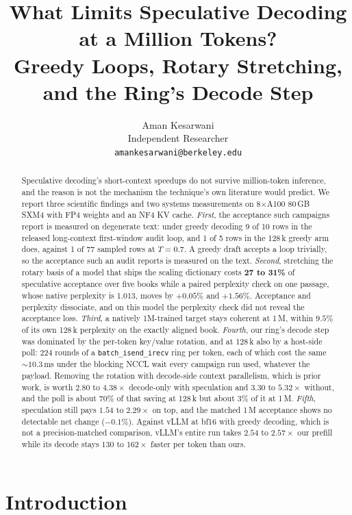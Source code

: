 \documentclass{article}
\author{%
  Aman Kesarwani \\
  Independent Researcher \\
  \texttt{amankesarwani@berkeley.edu} \\
}
\title{What Limits Speculative Decoding at a Million Tokens?\\
       Greedy Loops, Rotary Stretching, and the Ring's Decode Step}
\begin{document}
\maketitle

\begin{abstract}
Speculative decoding's short-context speedups do not survive million-token inference, and the
reason is not the mechanism the technique's own literature would predict. We report three
scientific findings and two systems measurements on 8$\times$A100 80\,GB SXM4 with FP4 weights
and an NF4 KV cache. \emph{First}, the acceptance such campaigns report is measured on
degenerate text: under greedy decoding 9 of 10 rows in the released long-context first-window
audit loop, and 1 of 5 rows in the 128\,k greedy arm does, against 1 of 77 sampled rows at
$T{=}0.7$. A greedy draft accepts a loop trivially, so the acceptance such an audit reports is
measured on the text. \emph{Second}, stretching the rotary basis of a model that ships the scaling dictionary
costs \textbf{27 to 31\%} of speculative acceptance over five books while a paired perplexity
check on one passage, whose native perplexity is 1.013, moves by $+0.05\%$ and $+1.56\%$.
Acceptance and perplexity dissociate, and on this model the perplexity check did not reveal
the acceptance loss. \emph{Third}, a natively 1M-trained target stays coherent at 1\,M, within
$9.5\%$ of its own 128\,k perplexity on the exactly aligned book. \emph{Fourth}, our ring's
decode step was dominated by the per-token key/value rotation, and at 128\,k also by a
host-side poll: 224 rounds of a \texttt{batch\_isend\_irecv} ring per token, each of which
cost the same ${\sim}10.3$\,ms under the blocking NCCL wait every campaign run used, whatever
the payload. Removing the rotation with decode-side context parallelism, which is prior work,
is worth $2.80$ to $4.38\times$ decode-only with speculation and $3.30$ to $5.32\times$
without, and the poll is about 70\% of that saving at 128\,k but about 3\% of it at 1\,M. \emph{Fifth}, speculation still pays $1.54$ to $2.29\times$ on top, and the matched
1\,M acceptance shows no detectable net change ($-0.1\%$). Against vLLM at bf16 with greedy
decoding, which is not a precision-matched comparison, vLLM's entire run takes $2.54$ to
$2.57\times$ our prefill while its decode stays $130$ to $162\times$ faster per token than
ours.
\end{abstract}

\section{Introduction}
\label{sec:intro}
\end{document}
